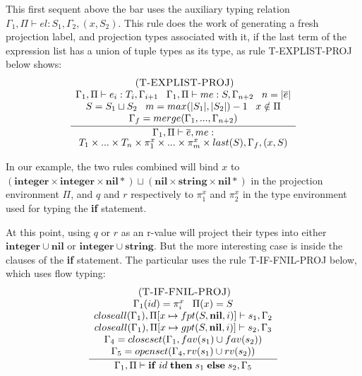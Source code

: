 \documentclass{sigplanconf}
\newcommand{\Nil}{\mathbf{nil}}
\newcommand{\Integer}{\mathbf{integer}}
\newcommand{\String}{\mathbf{string}}
\newcommand{\mylabel}[1]{\; (\textsc{#1})}
\newcommand{\env}{\Gamma}
\newcommand{\penv}{\Pi}
\begin{document}
This first sequent above the bar uses the auxiliary typing relation $\env_{1}, \penv \vdash el : S_{1}, \env_{2}, (x,S_{2})$.
This rule does the work of generating a fresh projection label,
and projection types associated with it, if the last term of
the expression list has a union of tuple types as its type,
as rule {\sc T-EXPLIST-PROJ} below shows:
\[
\begin{array}{c}
\mylabel{T-EXPLIST-PROJ}\\
\dfrac{\begin{array}{c}
	\env_{1}, \penv \vdash e_{i}:T_{i}, \env_{i+1} \;\;\;
	\env_{1}, \penv \vdash me:S, \env_{n+2} \;\;\; n=|\overline{e}|\\
	S = S_1 \sqcup S_2 \;\;\;m = max(|S_1|, |S_2|)-1 \;\;\; x \notin \Pi\\
	\env_{f} = merge(\env_{1}, ..., \env_{n+2})
	\end{array}}
{\env_{1}, \penv \vdash \overline{e},me:}\\ {T_{1} \times ... \times T_{n} \times \pi_{1}^{x} \times ... \times \pi_{m}^{x} \times last(S), \env_{f}, (x,S)}
\end{array}
\]

In our example, the two rules combined will bind $x$ to
$(\Integer \times \Integer \times \Nil{*}) \sqcup (\Nil \times \String \times \Nil{*})$ in the projection environment $\Pi$,
and $q$ and $r$ respectively to $\pi_{1}^{x}$ and $\pi_{2}^{x}$
in the type environment used for typing the {\bf if} statement.

At this point, using $q$ or $r$ as an r-value will project
their types into either $\Integer \cup \Nil$ or $\Integer \cup \String$. But the more interesting case is inside the
clauses of the {\bf if} statement. The particular uses the rule {\sc T-IF-FNIL-PROJ} below, which uses flow typing:
\[
\begin{array}{c}
\mylabel{T-IF-FNIL-PROJ}\\
\dfrac{\begin{array}{c}
       \env_{1}(id) = \pi_{i}^{x} \;\;\; \penv(x) = S\\
       closeall(\env_{1}), \penv[x \mapsto fpt(S,\Nil,i)] \vdash s_{1}, \env_{2} \\
       closeall(\env_{1}), \penv[x \mapsto gpt(S,\Nil,i)] \vdash s_{2}, \env_{3} \\
       \env_{4} = closeset(\env_{1}, fav(s_{1}) \cup fav(s_{2})) \\
       \env_{5} = openset(\env_{4}, rv(s_{1}) \cup rv(s_{2}))
      \end{array}}
      {\env_{1}, \penv \vdash \mathbf{if} \; id \; \mathbf{then} \; s_{1} \; \mathbf{else} \; s_{2}, \env_{5}}
\end{array}
\]
\end{document}
